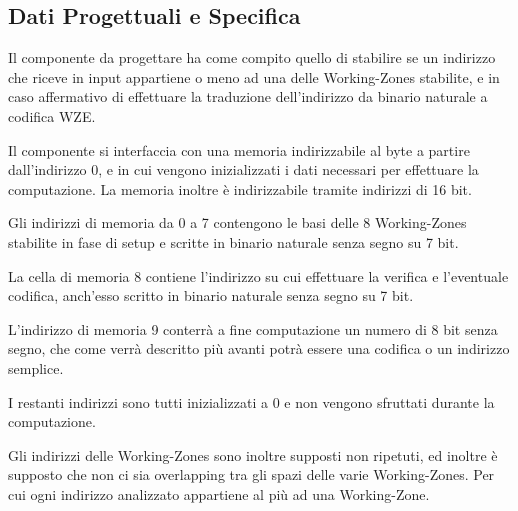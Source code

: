 \documentclass{article}
\begin{document}
\subsection{Dati Progettuali e Specifica}
\begin{flushleft}

Il componente da progettare ha come compito quello di stabilire se un indirizzo che riceve in input appartiene o meno ad una delle Working-Zones stabilite, e in caso affermativo di effettuare la traduzione dell'indirizzo da binario naturale a codifica WZE.

\medskip

Il componente si interfaccia con una memoria indirizzabile al byte a partire dall'indirizzo 0, e in cui vengono inizializzati i dati necessari per effettuare la computazione. La memoria inoltre è indirizzabile tramite indirizzi di 16 bit.

\medskip

Gli indirizzi di memoria da 0 a 7 contengono le basi delle 8 Working-Zones stabilite in fase di setup e scritte in binario naturale senza segno su 7 bit.
\smallskip

La cella di memoria 8 contiene l'indirizzo su cui effettuare la verifica e l'eventuale codifica, anch'esso scritto in binario naturale senza segno su 7 bit.
\smallskip

L'indirizzo di memoria 9 conterrà a fine computazione un numero di 8 bit senza segno, che come verrà descritto più avanti potrà essere una codifica o un indirizzo semplice.

\medskip

I restanti indirizzi sono tutti inizializzati a 0 e non vengono sfruttati durante la computazione.

\medskip

Gli indirizzi delle Working-Zones sono inoltre supposti non ripetuti, ed inoltre è supposto che non ci sia overlapping tra gli spazi delle varie Working-Zones. Per cui ogni indirizzo analizzato appartiene al più ad una Working-Zone.

\end{flushleft}
\end{document}
